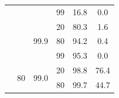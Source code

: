 \documentclass{article}
\begin{document}
\begin{table}
\begin{tabular}{|c|c|c|c|c|c|}
                                    &                                                                                        &                                                                                          & 99                                                                                      & 16.8                                                                      & 0.0                                                                       \\ \cline{3-6} 
                                    &                                                                                        & \multirow{3}{*}{99.9}                                                                    & 20                                                                                      & 80.3                                                                      & 1.6                                                                       \\ \cline{4-6} 
                                    &                                                                                        &                                                                                          & 80                                                                                      & 94.2                                                                      & 0.4                                                                       \\ \cline{4-6} 
                                    &                                                                                        &                                                                                          & 99                                                                                      & 95.3                                                                      & 0.0                                                                       \\ \cline{2-6} 
                                    & \multirow{6}{*}{80}                                                                    & \multirow{3}{*}{99.0}                                                                    & 20                                                                                      & 98.8                                                                      & 76.4                                                                      \\ \cline{4-6} 
                                    &                                                                                        &                                                                                          & 80                                                                                      & 99.7                                                                      & 44.7                                                                      \\ \cline{4-6} 

\end{tabular}
\end{table}
\end{document}
